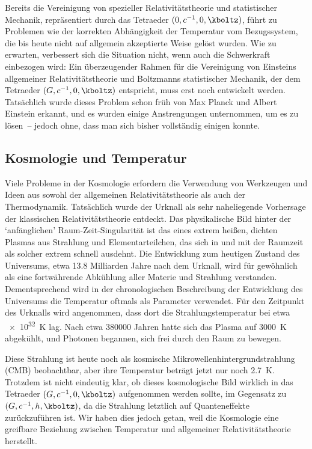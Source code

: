 \documentclass{scrartcl}
\begin{document}
\newpage {}
\label{sec:1101}

Bereits die Vereinigung von spezieller Relativitätstheorie und statistischer Mechanik, repräsentiert durch das Tetraeder $(0,c^{-1},0,\kboltz)$, führt zu Problemen wie der korrekten Abhängigkeit der Temperatur vom Bezugssystem, die bis heute nicht auf allgemein akzeptierte Weise gelöst wurden. Wie zu erwarten, verbessert sich die Situation nicht, wenn auch die Schwerkraft einbezogen wird: Ein überzeugender Rahmen für die Vereinigung von Einsteins allgemeiner Relativitätstheorie und Boltzmanns statistischer Mechanik, der dem Tetraeder $(G,c^{-1},0,\kboltz)$ entspricht, muss erst noch entwickelt werden. Tatsächlich wurde dieses Problem schon früh von Max Planck und Albert Einstein erkannt, und es wurden einige Anstrengungen unternommen, um es zu lösen~-- jedoch ohne, dass man sich bisher vollständig einigen konnte.


\subsection*{Kosmologie und Temperatur}

Viele Probleme in der Kosmologie erfordern die Verwendung von Werkzeugen und Ideen aus sowohl der allgemeinen Relativitätstheorie als auch der Thermodynamik. Tatsächlich wurde der Urknall als sehr naheliegende Vorhersage der klassischen Relativitätstheorie entdeckt. Das physikalische Bild hinter der \enquote*{anfänglichen} Raum-Zeit-Singularität ist das eines extrem heißen, dichten Plasmas aus Strahlung und Elementarteilchen, das sich in und mit der Raumzeit als solcher extrem schnell ausdehnt. Die Entwicklung zum heutigen Zustand des Universums, etwa \num{13.8} Milliarden Jahre nach dem Urknall, wird für gewöhnlich als eine fortwährende Abkühlung aller Materie und Strahlung verstanden. Dementsprechend wird in der chronologischen Beschreibung der Entwicklung des Universums die Temperatur oftmals als Parameter verwendet. Für den Zeitpunkt des Urknalls wird angenommen, dass dort die Strahlungstemperatur bei etwa \qty{e32}{\kelvin} lag. Nach etwa \num{380000} Jahren hatte sich das Plasma auf \qty{3000}{\kelvin} abgekühlt, und Photonen begannen, sich frei durch den Raum zu bewegen.

Diese Strahlung ist heute noch als kosmische Mikrowellenhintergrundstrahlung (CMB) beobachtbar, aber ihre Temperatur beträgt jetzt nur noch \qty{2.7}{\kelvin}. Trotzdem ist nicht eindeutig klar, ob dieses kosmologische Bild wirklich in das Tetraeder $(G,c^{-1},0,\kboltz)$ aufgenommen werden sollte, im Gegensatz zu $(G,c^{-1},h,\kboltz)$, da die Strahlung letztlich auf Quanteneffekte zurückzuführen ist. Wir haben dies jedoch getan, weil die Kosmologie eine greifbare Beziehung zwischen Temperatur und allgemeiner Relativitätstheorie herstellt.
\end{document}
